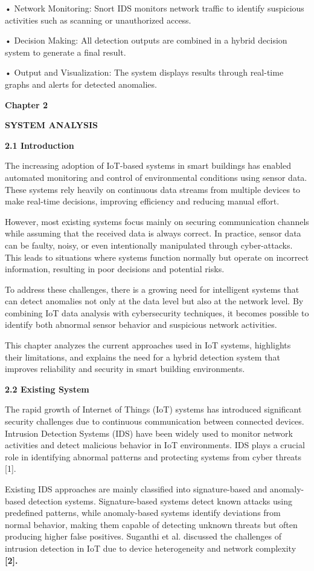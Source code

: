 • Network Monitoring: Snort IDS monitors network traffic to identify
suspicious activities such as scanning or unauthorized access.

• Decision Making: All detection outputs are combined in a hybrid
decision system to generate a final result.

• Output and Visualization: The system displays results through
real-time graphs and alerts for detected anomalies.

\textbf{Chapter 2}

\textbf{SYSTEM ANALYSIS}

\textbf{2.1 Introduction}

The increasing adoption of IoT-based systems in smart buildings has
enabled automated monitoring and control of environmental conditions
using sensor data. These systems rely heavily on continuous data streams
from multiple devices to make real-time decisions, improving efficiency
and reducing manual effort.

However, most existing systems focus mainly on securing communication
channels while assuming that the received data is always correct. In
practice, sensor data can be faulty, noisy, or even intentionally
manipulated through cyber-attacks. This leads to situations where
systems function normally but operate on incorrect information,
resulting in poor decisions and potential risks.

To address these challenges, there is a growing need for intelligent
systems that can detect anomalies not only at the data level but also at
the network level. By combining IoT data analysis with cybersecurity
techniques, it becomes possible to identify both abnormal sensor
behavior and suspicious network activities.

This chapter analyzes the current approaches used in IoT systems,
highlights their limitations, and explains the need for a hybrid
detection system that improves reliability and security in smart
building environments.

\textbf{2.2 Existing System}

The rapid growth of Internet of Things (IoT) systems has introduced
significant security challenges due to continuous communication between
connected devices. Intrusion Detection Systems (IDS) have been widely
used to monitor network activities and detect malicious behavior in IoT
environments. IDS plays a crucial role in identifying abnormal patterns
and protecting systems from cyber threats {[}1{]}.

Existing IDS approaches are mainly classified into signature-based and
anomaly-based detection systems. Signature-based systems detect known
attacks using predefined patterns, while anomaly-based systems identify
deviations from normal behavior, making them capable of detecting
unknown threats but often producing higher false positives. Suganthi et
al. discussed the challenges of intrusion detection in IoT due to device
heterogeneity and network complexity \textbf{{[}2{]}.}

